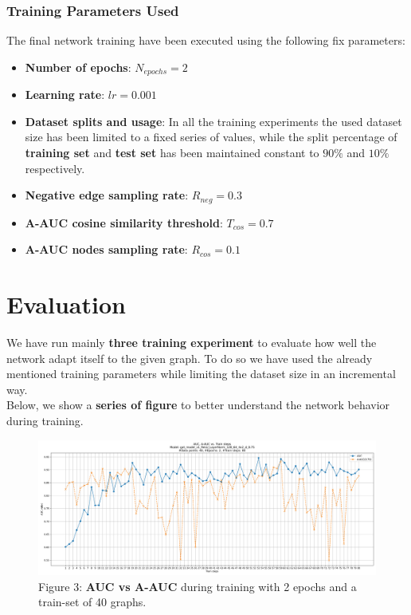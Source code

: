 \documentclass[11pt]{article}
\begin{document}
	\subsubsection{Training Parameters Used}
	The final network training have been executed using the following fix parameters:
	\begin{itemize}
		\item{\textbf{Number of epochs}}: $N_{epochs}=2$
		
		\item{\textbf{Learning rate}}: $lr=0.001$
		
		\item{\textbf{Dataset splits and usage}}: In all the training experiments the used dataset size has been limited to a fixed series of values, while the split percentage of \textbf{training set} and \textbf{test set} has been maintained constant to $90\%$ and $10\%$ respectively.    
				
		\item{\textbf{Negative edge sampling rate}}: $R_{neg}=0.3$
		
		\item{\textbf{A-AUC cosine similarity threshold}}: $T_{cos}=0.7$
		
		\item{\textbf{A-AUC nodes sampling rate}}: $R_{cos}=0.1$
	\end{itemize}
	
	\section{Evaluation}
	We have run mainly \textbf{three training experiment} to evaluate how well the network adapt itself to the given graph. To do so we have used the already mentioned training parameters while limiting the dataset size in an incremental way. \\
	Below, we show a \textbf{series of figure} to better understand the network behavior during training.
	
	\begin{figure}[h!] %
		\centering
		\label{figure_3}
		\includegraphics[width=1\textwidth]{images/train_auc_gat_model_v1_ReLU_LayerNorm_128_64_4x2_d_0.75_40_2_20250202-144005.jpg}
		\caption{Figure 3: \textbf{AUC vs A-AUC} during training with 2 epochs and a train-set of 40 graphs.}
	\end{figure}
	
\end{document}

